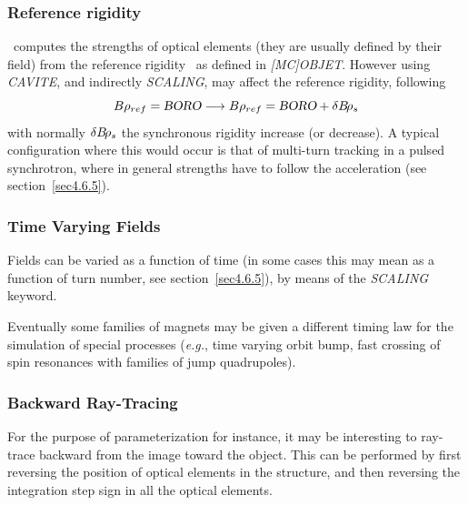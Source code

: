 {\newpage

\subsubsection{Reference rigidity}  \label{sec4.6.RefBORO} 

\zgoubi\ computes the strengths of optical elements (they are usually defined by their field) from the reference 
rigidity \BORO\ as defined in \textsl{[MC]OBJET}. However using \textsl{CAVITE}, and indirectly \textsl{SCALING},  
may affect the reference rigidity, following 
$$B\rho_{ref} = \textsl{BORO} \longrightarrow B\rho_{ref} = \textsl{BORO} + \delta B\!\rho_s$$  
\noindent with normally $\delta B\!\rho_s$ the synchronous rigidity increase (or decrease). A typical configuration where this would 
occur is that of multi-turn tracking  
in a pulsed synchrotron, where in general strengths have to follow the  
acceleration (see section~\ref{sec4.6.5}). 



\subsubsection{Time Varying Fields} \label{sec4.6.TimeVFields} 

Fields can be varied as a function of time  (in some cases this may mean as a function of turn number, 
see section~\ref{sec4.6.5}), by means of the  \textsl{SCALING} keyword. 

\medskip

\noindent Eventually some families of magnets may be given a different timing law 
    for the simulation of special processes (\emph{e.g.}, time varying orbit bump, 
fast crossing of spin resonances with families of jump quadrupoles). 


\subsubsection{Backward Ray-Tracing} \label{sec4.6.3} 
 

For the purpose of parameterization for instance, it may be interesting to ray-trace 
backward  from the image toward the object.  This can be performed by first 
reversing the position of optical elements in the structure, and then 
reversing the integration step sign in all the optical elements.  
\medskip

}

